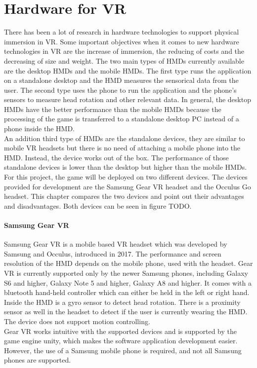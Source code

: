 \newpage
\section{Hardware for VR} \label{hardware}
There has been a lot of research in hardware technologies to support physical immersion in VR. Some important objectives when it comes to new hardware technologies in VR are the increase of immersion, the reducing of costs and the decreasing of size and weight. The two main types of HMDs currently available are the desktop HMDs and the mobile HMDs. The first type runs the application on a standalone desktop and the HMD measures the sensorical data from the user. The second type uses the phone to run the application and the phone's sensors to measure head rotation and other relevant data. In general, the desktop HMDs have the better performance than the mobile HMDs because the processing of the game is transferred to a standalone desktop PC instead of a phone inside the HMD. \cite{Dorner.2013}\\
An addition third type of HMDs are the standalone devices, they are similar to mobile VR headsets but there is no need of attaching a mobile phone into the HMD. Instead, the device works out of the box. The performance of those standalone devices is lower than the desktop but higher than the mobile HMDs. \cite{http://www.isaca.org/Knowledge-Center/Blog/Lists/Posts/Post.aspx?ID=975&utm_referrer=direct%
}\\
For this project, the game will be deployed on two different devices. The devices provided for development are the Samsung Gear VR headset and the Occulus Go headset. This chapter compares the two devices and point out their advantages and disadvantages. Both devices can be seen in figure  TODO. %

\paragraph{Samsung Gear VR} Samsung Gear VR is a mobile based VR headset which was developed by Samsung and Occulus, introduced in 2017. The performance and screen resolution of the HMD depends on the mobile phone, used with the headset. Gear VR is currently supported only by the newer Samsung phones, including Galaxy S6 and higher, Galaxy Note 5 and higher, Galaxy A8 and higher.
It comes with a bluetooth hand-held controller which can either be held in the left or right hand. Inside the HMD is a gyro sensor to detect head rotation. There is a proximity sensor as well in the headset to detect if the user is currently wearing the HMD. The device does not support motion controlling. \cite{Samsung.2019}\\
Gear VR works intuitive with the supported devices and is supported by the game engine unity, which makes the software application development easier. However, the use of a Samsung mobile phone is required, and not all Samsung phones are supported.
